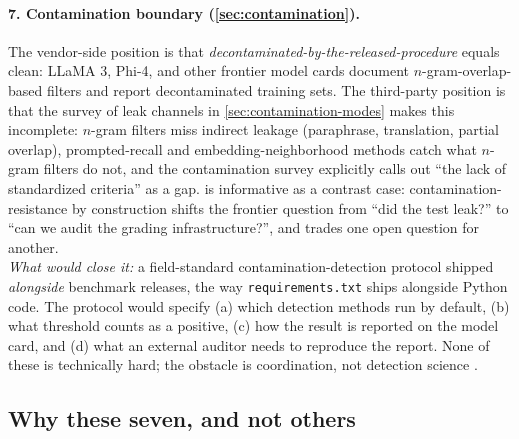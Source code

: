 \paragraph{7. Contamination boundary (\cref{sec:contamination}).}
The vendor-side position is that
\emph{decontaminated-by-the-released-procedure} equals clean:
LLaMA 3, Phi-4, and other frontier model cards document
$n$-gram-overlap-based filters and report decontaminated training
sets. The third-party position is that the survey of leak
channels in \cref{sec:contamination-modes} makes this incomplete:
$n$-gram filters miss indirect leakage (paraphrase, translation,
partial overlap), prompted-recall and embedding-neighborhood
methods catch what $n$-gram filters do not, and the
contamination survey \citep{contamination-survey-2025} explicitly
calls out ``the lack of standardized criteria'' as a gap.
\citet{glazer2024-frontiermath} is informative as a contrast case:
contamination-resistance by construction shifts the frontier
question from ``did the test leak?'' to ``can we audit the
grading infrastructure?'', and trades one open question for
another.\\
\emph{What would close it:} a field-standard
contamination-detection protocol shipped \emph{alongside}
benchmark releases, the way \texttt{requirements.txt} ships
alongside Python code. The protocol would specify (a) which
detection methods run by default, (b) what threshold counts as
a positive, (c) how the result is reported on the model card, and
(d) what an external auditor needs to reproduce the report. None
of these is technically hard; the obstacle is coordination, not
detection science \citep{contamination-survey-2025,
glazer2024-frontiermath, mmlu-redux-2024}.

\subsection{Why these seven, and not others}
\label{sec:contradictions-density}

